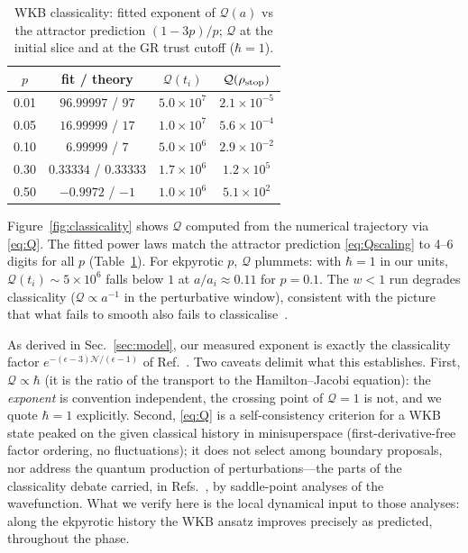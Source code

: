 \documentclass[11pt,a4paper]{article}
\newcommand{\cQ}{\mathcal{Q}}
\begin{document}
\begin{table}[b]
  \centering\small
  \caption{WKB classicality: fitted exponent of $\cQ(a)$ vs the attractor
  prediction $(1-3p)/p$; $\cQ$ at the initial slice and at the GR trust
  cutoff ($\hbar=1$).}
  \label{tab:Q}
  \begin{tabular}{cccc}
    \toprule
    $p$ & fit / theory & $\cQ(t_i)$ & $\cQ(\rho_{\rm stop})$\\
    \midrule
    0.01 & $96.99997$ / $97$  & $5.0\times10^{7}$ & $2.1\times10^{-5}$\\
    0.05 & $16.99999$ / $17$  & $1.0\times10^{7}$ & $5.6\times10^{-4}$\\
    0.10 & $6.99999$ / $7$    & $5.0\times10^{6}$ & $2.9\times10^{-2}$\\
    0.30 & $0.33334$ / $0.33333$ & $1.7\times10^{6}$ & $1.2\times10^{5}$\\
    0.50 & $-0.9972$ / $-1$   & $1.0\times10^{6}$ & $5.1\times10^{2}$\\
    \bottomrule
  \end{tabular}
\end{table}

Figure~\ref{fig:classicality} shows $\cQ$ computed from the numerical
trajectory via \eqref{eq:Q}. The fitted power laws match the attractor
prediction \eqref{eq:Qscaling} to 4--6 digits for all $p$
(Table~\ref{tab:Q}). For ekpyrotic $p$, $\cQ$ plummets: with $\hbar=1$ in
our units, $\cQ(t_i)\sim5\times10^6$ falls below $1$ at
$a/a_i\approx0.11$ for $p=0.1$. The $w<1$ run degrades classicality
($\cQ\propto a^{-1}$ in the perturbative window), consistent with the
picture that what fails to smooth also fails to
classicalise~\cite{Lehners:2015}.

As derived in Sec.~\ref{sec:model}, our measured exponent is exactly the
classicality factor $e^{-(\epsilon-3)\mathcal N/(\epsilon-1)}$ of
Ref.~\cite{Lehners:2015}. Two caveats delimit what this establishes.
First, $\cQ\propto\hbar$ (it is the ratio of the transport to the
Hamilton--Jacobi equation): the \emph{exponent} is convention independent,
the crossing point of $\cQ=1$ is not, and we quote $\hbar=1$ explicitly.
Second, \eqref{eq:Q} is a self-consistency criterion for a WKB state peaked
on the given classical history in minisuperspace (first-derivative-free
factor ordering, no fluctuations); it does not select among boundary
proposals, nor address the quantum production of perturbations---the parts
of the classicality debate carried, in Refs.~\cite{Lehners:2015,
BattarraLehners:2014,Feldbrugge:2017}, by saddle-point analyses of the
wavefunction. What we verify here is the local dynamical input to those
analyses: along the ekpyrotic history the WKB ansatz improves precisely as
predicted, throughout the phase.
\end{document}
